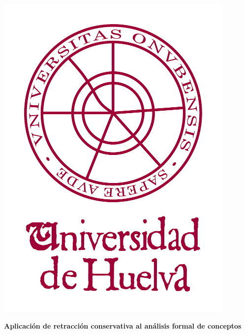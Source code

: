 \thispagestyle{empty}
\begin{center}
\includegraphics[scale=0.4]{./00_Titulo/figs/logoUHU}
\end{center}
\vspace*{0cm}
\Large 
%

\vspace{2cm}

\LARGE

\begin{center}
{\bf  Aplicación de retracción conservativa al análisis formal de conceptos}
\end{center} 

\Large





